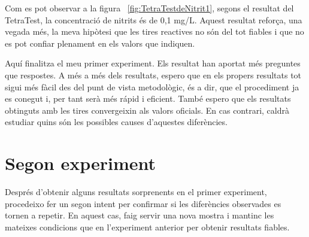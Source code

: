 Com es pot observar a la figura~ \ref{fig:TetraTestdeNitrit1}, segons el resultat del TetraTest, la concentració de nitrits és de 0,1 mg/L. Aquest resultat reforça, una vegada més, la meva hipòtesi que les tires reactives no són del tot fiables i que no es pot confiar plenament en els valors que indiquen.

Aquí finalitza el meu primer experiment. Els resultat han aportat més preguntes que respostes. A més a més dels resultats, espero que en els propers resultats tot sigui més fàcil des del punt de vista metodològic, és a dir, que el procediment ja es conegut i, per tant serà més rápid i eficient. També espero que els resultats obtinguts amb les tires convergeixin als valors oficials. En cas contrari, caldrà estudiar quins són les possibles causes d'aquestes diferències.


\clearpage

\section{Segon experiment}


Després d’obtenir alguns resultats sorprenents en el primer experiment, procedeixo fer un segon intent per confirmar si les diferències observades es tornen a repetir. En aquest cas, faig servir una nova mostra i mantinc les mateixes condicions que en l'experiment anterior per obtenir resultats fiables.

